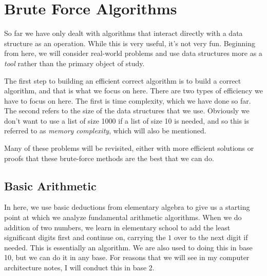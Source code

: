 \section{Brute Force Algorithms} 

  So far we have only dealt with algorithms that interact directly with a data structure as an operation. While this is very useful, it's not very fun. Beginning from here, we will consider real-world problems and use data structures more as a \textit{tool} rather than the primary object of study. 

  The first step to building an efficient correct algorithm is to build a correct algorithm, and that is what we focus on here. There are two types of efficiency we have to focus on here. The first is time complexity, which we have done so far. The second refers to the size of the data structures that we use. Obviously we don't want to use a list of size 1000 if a list of size 10 is needed, and so this is referred to as \textit{memory complexity}, which will also be mentioned. 

  Many of these problems will be revisited, either with more efficient solutions or proofs that these brute-force methods are the best that we can do. 

\subsection{Basic Arithmetic}

  In here, we use basic deductions from elementary algebra to give us a starting point at which we analyze fundamental arithmetic algorithms. When we do addition of two numbers, we learn in elementary school to add the least significant digits first and continue on, carrying the $1$ over to the next digit if needed. This is essentially an algorithm. We are also used to doing this in base 10, but we can do it in any base. For reasons that we will see in my computer architecture notes, I will conduct this in base 2. 

